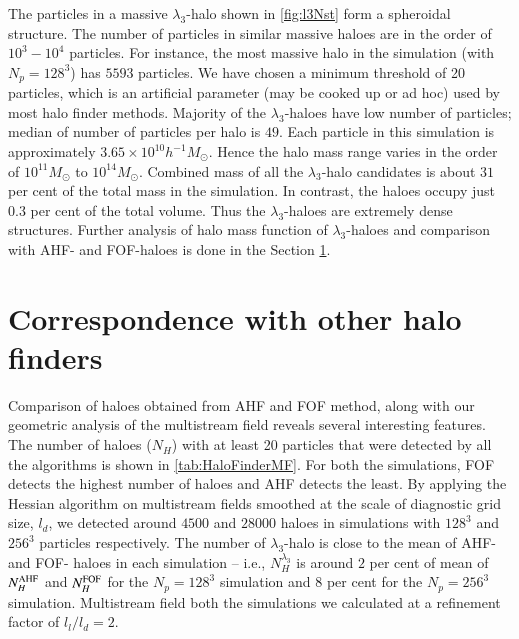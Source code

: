 The particles in a massive $\lambda_3$-halo shown in \autoref{fig:l3Nst} form a spheroidal structure. The number of particles in similar massive haloes are in the order of $10^3 - 10^4$ particles. For instance, the most massive halo in the simulation (with $N_p = 128^3$) has $5593$ particles. We have chosen a minimum threshold of 20 particles, which is an artificial parameter (may be cooked up or ad hoc) used by most halo finder methods. Majority of the $\lambda_3$-haloes have low number of particles; median of number of particles per halo is $49$. Each particle in this simulation is approximately $ 3.65 \times 10^{10} h^{-1} M_{\odot}$. Hence the halo mass range varies in the order of $10^{11} M_{\odot}$ to $10^{14} M_{\odot}$. Combined mass of all the $\lambda_3$-halo candidates is about $31$ per cent of the total mass in the simulation. In contrast, the haloes occupy just $0.3$ per cent of the total volume. Thus the $\lambda_3$-haloes are extremely dense structures. Further analysis of halo mass function of $\lambda_3$-haloes and comparison with AHF- and FOF-haloes is done in the Section \ref{sub:compareHalo}.  



\section{Correspondence with other halo finders}
\label{sub:compareHalo}




Comparison of haloes obtained from AHF and FOF method, along with our geometric analysis of the multistream field reveals several interesting features. The number of haloes ($N_H$) with at least 20 particles that were detected by all the algorithms is shown in \autoref{tab:HaloFinderMF}. For both the simulations, FOF detects the highest number of haloes and AHF detects the least. By applying the Hessian algorithm on multistream fields smoothed at the scale of diagnostic grid size, $l_d$, we detected around $4500$ and $28000$ haloes in simulations with $128^3$ and $256^3$ particles respectively. The number of $\lambda_3$-halo is close to the mean of AHF- and FOF- haloes in each simulation -- i.e., $N_H^{\lambda_3}$ is around $2$ per cent of mean of $N_H^{\rm AHF}$ and $N_H^{\rm FOF}$ for the $N_p = 128^3$ simulation and $8$ per cent for the $N_p = 256^3$ simulation. Multistream field both the simulations we calculated at a refinement factor of $l_l/l_d = 2$. 

